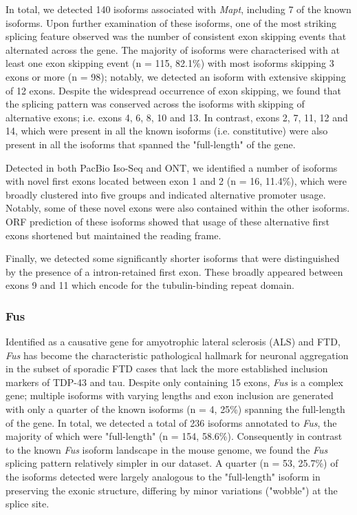 In total, we detected 140 isoforms associated with \textit{Mapt}, including 7 of the known isoforms. Upon further examination of these isoforms, one of the most striking splicing feature observed was the number of consistent exon skipping events that alternated across the gene. The majority of isoforms were characterised with at least one exon skipping event (n = 115, 82.1\%) with most isoforms skipping 3 exons or more (n = 98); notably, we detected an isoform with extensive skipping of 12 exons. Despite the widespread occurrence of exon skipping, we found that the splicing pattern was conserved across the isoforms with skipping of alternative exons; i.e. exons 4, 6, 8, 10 and 13. In contrast, exons 2, 7, 11, 12 and 14, which were present in all the known isoforms (i.e. constitutive) were also present in all the isoforms that spanned the "full-length" of the gene. 

Detected in both PacBio Iso-Seq and ONT, we identified a number of isoforms with novel first exons located between exon 1 and 2 (n = 16, 11.4\%), which were broadly clustered into five groups and indicated alternative promoter usage. Notably, some of these novel exons were also contained within the other isoforms. ORF prediction of these isoforms showed that usage of these alternative first exons shortened but maintained the reading frame. 

Finally, we detected some significantly shorter isoforms that were distinguished by the presence of a intron-retained first exon. These broadly appeared between exons 9 and 11 which encode for the tubulin-binding repeat domain. 

\subsubsection{Fus}
Identified as a causative gene for amyotrophic lateral sclerosis (ALS) and FTD, \textit{Fus} has become the characteristic pathological hallmark for neuronal aggregation in the subset of sporadic FTD cases that lack the more established inclusion markers of TDP-43 and tau\cite{Seelaar2010}. Despite only containing 15 exons, \textit{Fus} is a complex gene; multiple isoforms with varying lengths and exon inclusion are generated with only a quarter of the known isoforms (n = 4, 25\%) spanning the full-length of the gene. In total, we detected a total of 236 isoforms annotated to \textit{Fus}, the majority of which were "full-length" (n = 154, 58.6\%). Consequently in contrast to the known \textit{Fus} isoform landscape in the mouse genome, we found the \textit{Fus} splicing pattern relatively simpler in our dataset. A quarter (n = 53, 25.7\%) of the isoforms detected were largely analogous to the "full-length" isoform in preserving the exonic structure, differing by minor variations ("wobble") at the splice site. 

